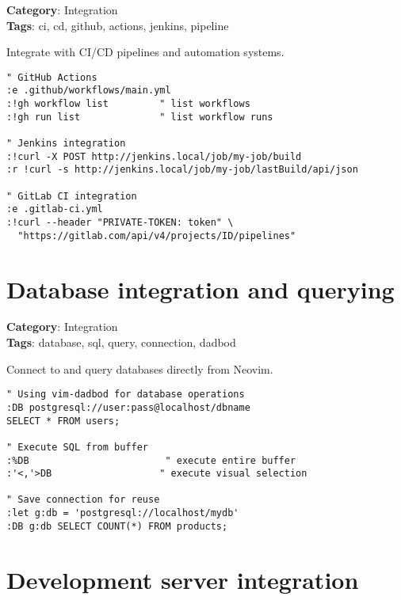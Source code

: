 {{{{{{\textbf{Category}: Integration\\ \textbf{Tags}: ci, cd, github, actions, jenkins, pipeline
\vspace{0.5cm}

Integrate with CI/CD pipelines and automation systems.

\begin{Exa*}{}
\begin{Verbatim}[fontsize=\footnotesize, breaklines, breakanywhere]
" GitHub Actions
:e .github/workflows/main.yml
:!gh workflow list         " list workflows
:!gh run list              " list workflow runs

" Jenkins integration
:!curl -X POST http://jenkins.local/job/my-job/build
:r !curl -s http://jenkins.local/job/my-job/lastBuild/api/json

" GitLab CI integration
:e .gitlab-ci.yml
:!curl --header "PRIVATE-TOKEN: token" \
  "https://gitlab.com/api/v4/projects/ID/pipelines"
\end{Verbatim}
\end{Exa*}

\section{Database integration and querying}

\textbf{Category}: Integration\\ \textbf{Tags}: database, sql, query, connection, dadbod
\vspace{0.5cm}

Connect to and query databases directly from Neovim.

\begin{Exa*}{}
\begin{Verbatim}[fontsize=\footnotesize, breaklines, breakanywhere]
" Using vim-dadbod for database operations
:DB postgresql://user:pass@localhost/dbname
SELECT * FROM users;

" Execute SQL from buffer
:%DB                        " execute entire buffer
:'<,'>DB                   " execute visual selection

" Save connection for reuse
:let g:db = 'postgresql://localhost/mydb'
:DB g:db SELECT COUNT(*) FROM products;
\end{Verbatim}
\end{Exa*}

\section{Development server integration}

}}}}}}
